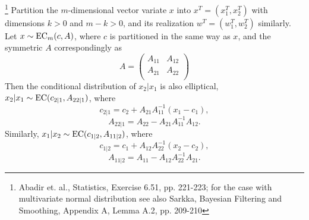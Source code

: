 \begin{lemma} \label{L:ell_cond}
\footnote{Abadir et. al., Statistics, Exercise 6.51, pp. 221-223; for
	the case with multivariate normal distribution see also Sarkka, Bayesian 
	Filtering and Smoothing, Appendix A, Lemma A.2, pp. 209-210}
Partition the $m$-dimensional vector variate $x$ into $x^T=(x_1^T, x_2^T)$ with
dimensions $k>0$ and $m-k>0$, and its realization $w^T=(w_1^T,w_2^T)$ similarly.
Let $x\sim \operatorname*{EC}_m(c,A)$,  where $c$ is partitioned in the same way as $x$, and
the symmetric $A$ correspondingly as
\[
  A=
  \begin{pmatrix}
    A_{11} & A_{12}\\
    A_{21} & A_{22}\\
  \end{pmatrix}
\]
Then the conditional distribution of $x_2|x_1$ is also elliptical, 
$x_2|x_1 \sim \operatorname*{EC} (c_{2|1},A_{22|1})$, where
\[
  c_{2|1} = c_2 + A_{21} A_{11}^{-1} (x_1-c_1),
\]
\[
  A_{22|1} = A_{22} - A_{21} A_{11}^{-1} A_{12}.
\]
Similarly, 
$x_1|x_2 \sim \operatorname*{EC} (c_{1|2},A_{11|2})$, where
\[
  c_{1|2} = c_1 + A_{12} A_{22}^{-1} (x_2-c_2),
\]
\[
  A_{11|2} = A_{11} - A_{12} A_{22}^{-1} A_{21}.
\]
\end{lemma}
